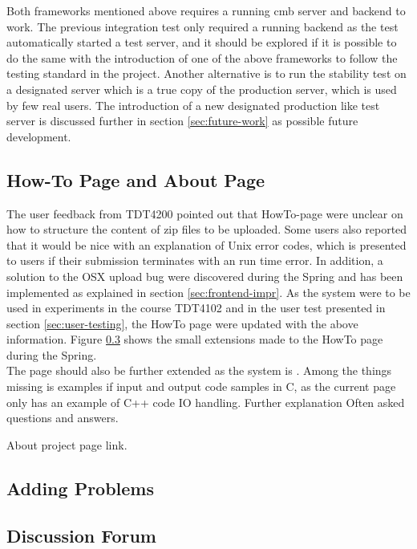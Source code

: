 Both frameworks mentioned above requires a running \gls{cmb} server and backend to work. The previous integration test only required a running backend as the test automatically started a test server, and it should be explored if it is possible to do the same with the introduction of one of the above frameworks to follow the testing standard in the project. Another alternative is to run the stability test on a designated server which is a true copy of the production server, which is used by few real users. The introduction of a new designated production like test server is discussed further in section \ref{sec:future-work} as possible future development.

\subsection{How-To Page and About Page}
The user feedback from TDT4200 \cite{TDT4200} pointed out that HowTo-page were unclear on how to structure the content of zip files to be uploaded. Some users also reported that it would be nice with an explanation of Unix error codes, which is presented to users if their submission terminates with an run time error. In addition, a solution to the OSX upload bug were discovered during the Spring and has been implemented as explained in section \ref{sec:frontend-impr}. As the system were to be used in experiments in the course TDT4102 \cite{TDT4102} and in the user test presented in section \ref{sec:user-testing}, the HowTo page were updated with the above information. Figure \ref{} shows the small extensions made to the HowTo page during the Spring. \\

The page should also be further extended as the system is . Among the things missing is examples if input and output code samples in C, as the current page only has an example of C++ code IO handling. Further explanation
Often asked questions and answers.

About project page link.


\subsection{Adding Problems}

\subsection{Discussion Forum}
